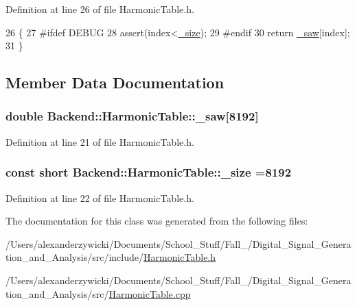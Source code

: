 Definition at line 26 of file Harmonic\+Table.\+h.


\begin{DoxyCode}
26                                                                   \{
27 \textcolor{preprocessor}{#ifdef DEBUG}
28     assert(index<\hyperlink{class_backend_1_1_harmonic_table_a94c9f17b8fd4b514d145fbb8b0ed63dd}{\_size});
29 \textcolor{preprocessor}{#endif}
30     \textcolor{keywordflow}{return} \hyperlink{class_backend_1_1_harmonic_table_a464db802494a562d2c9d0840ee6d1483}{\_saw}[index];
31 \}
\end{DoxyCode}


\subsection{Member Data Documentation}
\hypertarget{class_backend_1_1_harmonic_table_a464db802494a562d2c9d0840ee6d1483}{
\subsubsection[{\+\_\+saw}]{\setlength{\rightskip}{0pt plus 5cm}double Backend\+::\+Harmonic\+Table\+::\+\_\+saw\mbox{[}8192\mbox{]}\hspace{0.3cm}{\ttfamily [protected]}}}\label{class_backend_1_1_harmonic_table_a464db802494a562d2c9d0840ee6d1483}


Definition at line 21 of file Harmonic\+Table.\+h.

\hypertarget{class_backend_1_1_harmonic_table_a94c9f17b8fd4b514d145fbb8b0ed63dd}{
\subsubsection[{\+\_\+size}]{\setlength{\rightskip}{0pt plus 5cm}const short Backend\+::\+Harmonic\+Table\+::\+\_\+size =8192\hspace{0.3cm}{\ttfamily [protected]}}}\label{class_backend_1_1_harmonic_table_a94c9f17b8fd4b514d145fbb8b0ed63dd}


Definition at line 22 of file Harmonic\+Table.\+h.



The documentation for this class was generated from the following files\+:\begin{DoxyCompactItemize}
\item 
/\+Users/alexanderzywicki/\+Documents/\+School\+\_\+\+Stuff/\+Fall\+\_/\+Digital\+\_\+\+Signal\+\_\+\+Generation\+\_\+and\+\_\+\+Analysis/src/include/\hyperlink{_harmonic_table_8h}{Harmonic\+Table.\+h}\item 
/\+Users/alexanderzywicki/\+Documents/\+School\+\_\+\+Stuff/\+Fall\+\_/\+Digital\+\_\+\+Signal\+\_\+\+Generation\+\_\+and\+\_\+\+Analysis/src/\hyperlink{_harmonic_table_8cpp}{Harmonic\+Table.\+cpp}\end{DoxyCompactItemize}
